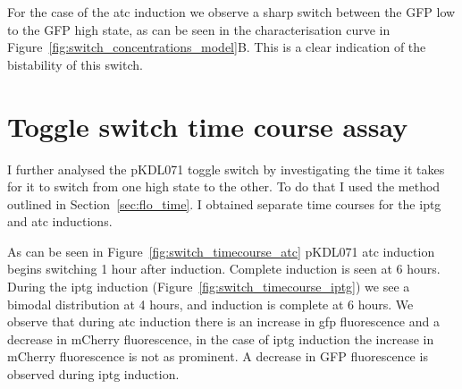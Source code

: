 For the case of the \acrshort{atc} induction we observe a sharp switch between the GFP low to the GFP high state, as can be seen in the characterisation curve in Figure~\ref{fig:switch_concentrations_model}B. This is a clear indication of the bistability of this switch.

\clearpage





\section{Toggle switch time course assay}

I further analysed the pKDL071 toggle switch by investigating the time it takes for it to switch from one high state to the other. To do that I used the method outlined in Section~\ref{sec:flo_time}. I obtained separate time courses for the \acrshort{iptg} and \acrshort{atc} inductions. 

As can be seen in Figure~\ref{fig:switch_timecourse_atc} pKDL071 \acrshort{atc}  induction begins switching 1 hour after induction. Complete induction is seen at 6 hours. During the \acrshort{iptg} induction (Figure~\ref{fig:switch_timecourse_iptg}) we see a bimodal distribution at 4 hours, and induction is complete at 6 hours. We observe that during \acrshort{atc} induction there is an increase in \acrshort{gfp} fluorescence and a decrease in mCherry fluorescence, in the case of \acrshort{iptg} induction the increase in mCherry fluorescence is not as prominent. A decrease in GFP fluorescence is observed during \acrshort{iptg} induction. 

